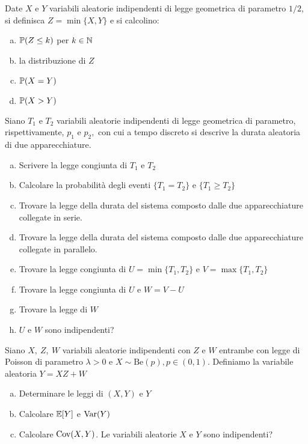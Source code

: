 \Esercizio{}

Date $X$ e $Y$ variabili aleatorie indipendenti di legge geometrica di parametro $1/2$, si definisca $Z=\min \{X,Y\}$ e si calcolino:

\begin{enumerate}[a)]
	\item $\mathbb{P} (Z\leq k)$ per $k\in \mathbb{N}$
	\item la distribuzione di $Z$
	\item $\mathbb{P} (X=Y)$
	\item $\mathbb{P} (X >Y)$
\end{enumerate}

\Esercizio{}

Siano $T_{1}$ e $T_{2}$ variabili aleatorie indipendenti di legge geometrica di parametro, rispettivamente, $p_{1}$ e $p_{2} ,$ con cui a tempo discreto si descrive la durata aleatoria di due apparecchiature.
\begin{enumerate}[a)]
	\item Scrivere la legge congiunta di $T_{1}$ e $T_{2}$
	\item Calcolare la probabilità degli eventi $\{T_{1} =T_{2}\}$ e $\{T_{1} \geq T_{2}\}$
	\item Trovare la legge della durata del sistema composto dalle due apparecchiature collegate in serie.
	\item Trovare la legge della durata del sistema composto dalle due apparecchiature collegate in parallelo.
	\item Trovare la legge congiunta di $U=\min\{T_{1} ,T_{2}\}$ e $V=\max\{T_{1} ,T_{2}\}$
	\item Trovare la legge congiunta di $U$ e $W=V-U$
	\item Trovare la legge di $W$
	\item $U$ e $W$ sono indipendenti?
\end{enumerate}

\Esercizio{}

Siano $X,\ Z,\ W$ variabili aleatorie indipendenti con $Z$ e $W$ entrambe con legge di Poisson di parametro $\lambda  >0$ e $X\sim \mathrm{Be} (p),p\in (0,1)$. Definiamo la variabile aleatoria $Y=XZ+W$
\begin{enumerate}[a)]
	\item Determinare le leggi di $(X,Y)$ e $Y$
	\item Calcolare $\mathbb{E} [Y]$ e $\operatorname{Var}(Y)$
	\item Calcolare $\operatorname{Cov} (X,Y)$. Le variabili aleatorie $X$ e $Y$ sono indipendenti?
\end{enumerate}

